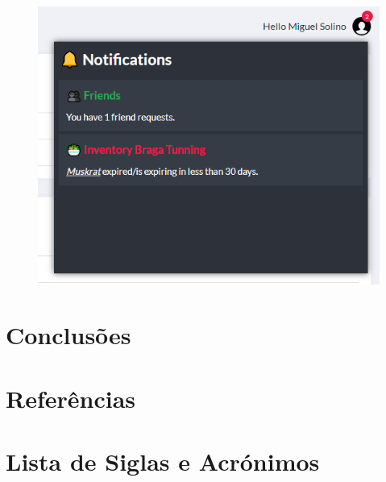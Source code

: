\documentclass[a4paper]{report}
\begin{document}
    \begin{figure}[H]
        \centering
            \includegraphics[width=\textwidth]{images/produto_final/notificacoes.png}
    \end{figure}

\chapter{Conclusões}

\chapter{Referências}

\chapter{Lista de Siglas e Acrónimos}
\end{document}
